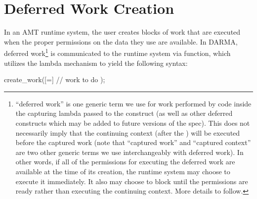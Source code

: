 \section{Deferred Work Creation}
\label{sec:deferred}
In an AMT \gls{runtime system}, the user creates blocks of work that
are executed when the proper permissions on the data they use are available.
In DARMA, \gls{deferred work}\footnote{``\Gls{deferred work}'' is one generic term we use for work
performed by code inside the capturing \gls{lambda} passed to the
 construct (as well as other deferred constructs which
may be added to future versions of the spec).  This does not necessarily imply
that the \gls{continuing context} (after the ) will be
executed before the \gls{captured work} (note that ``\gls{captured work}'' and
``\gls{captured context}'' are two other generic terms we use interchangeably
with \gls{deferred work}).  
In other words, if all of the permissions for executing the \gls{deferred work} are
available at the time of its creation, the \gls{runtime system} may choose to execute it
immediately.  It also may choose to block until the permissions are ready rather
than executing the \gls{continuing context}.  More details to follow.}
 is communicated
to the \gls{runtime system} via  function, which utilizes
the \CC{} \gls{lambda} mechanism to yield the following syntax:
\begin{CppCode}
  create_work([=]{
    // work to do
  });
\end{CppCode}

